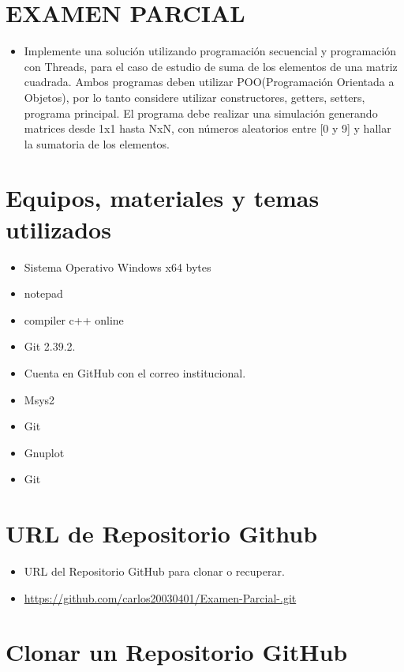 \documentclass{article}
\begin{document}
	\section{EXAMEN PARCIAL}
	\begin{itemize}		
		\item Implemente una solución utilizando programación secuencial y programación con Threads, para el caso de estudio de suma de los elementos de una matriz cuadrada. Ambos programas deben utilizar POO(Programación Orientada a Objetos), por lo tanto considere utilizar constructores, getters, setters, programa principal. El programa debe realizar una simulación generando matrices desde 1x1 hasta NxN, con números aleatorios entre [0 y 9] y hallar la sumatoria de los elementos.

	\end{itemize}
		
	\section{Equipos, materiales y temas utilizados}
	\begin{itemize}
		\item Sistema Operativo Windows x64 bytes
		\item notepad
		\item compiler c++ online
		\item Git 2.39.2.
		\item Cuenta en GitHub con el correo institucional.
        \item Msys2
        \item Git
        \item Gnuplot
        \item Git

	\end{itemize}
	
	\section{URL de Repositorio Github}
	\begin{itemize}
		\item URL del Repositorio GitHub para clonar o recuperar.
		\item \url{https://github.com/carlos20030401/Examen-Parcial-.git}

	\end{itemize}


 
	\section{Clonar un Repositorio GitHub}
\end{document}
